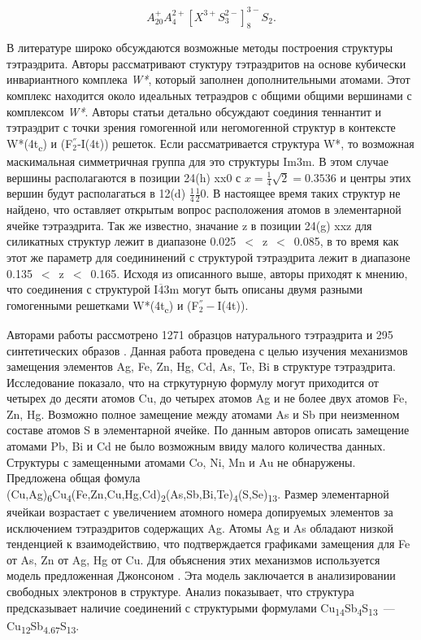 \begin{equation}
  \label{eq:equation3}
  A^+_{20}A^{2+}_4[X^{3+}S^{2-}_{3}]^{3-}_{8}S_2.
\end{equation}



В литературе широко обсуждаются возможные методы построения структуры тэтраэдрита. Авторы \cite{Koch_1981} рассматривают стуктуру тэтраэдритов на основе  кубически инвариантного комплека  \textit{W*}, который заполнен дополнительными атомами. Этот комплекс находится  около идеальных тетраэдров с общими общими вершинами с комплексом \textit{W*}. 
Авторы статьи детально обсуждают соединия теннантит и тэтраэдрит с точки зрения гомогенной или негомогенной структур в контексте W*(4t\textsubscript{c}) и (F$^{''}_{2}$-I(4t)) решеток. 
Если рассматривается структура W*, то возможная маскимальная симметричная группа для это структуры Im3m. В этом случае вершины располагаются в позиции 24(h) xx0 с $x = \frac{1}{4}\sqrt{2} = 0.3536$ и центры этих вершин будут располагаться в 12(d) $\frac{1}{4}\frac{1}{2}0$. 
В настоящее время таких структур не найдено, что оставляет открытым вопрос расположения атомов в элементарной ячейке тэтраэдрита. 
Так же известно, значание  z в позиции 24(g) xxz для силикатных структур лежит в диапазоне 0.025~$<$~z~$<$~0.085, в то время как этот же параметр для соедининений с структурой тэтраэдрита лежит в диапазоне 0.135~$<$~z~$<$~0.165.
Исходя из описанного выше, авторы приходят к мнению, что соединения с структурой I$\overline{\!4}$3m могут быть описаны двумя разными гомогенными решетками W*(4t\textsubscript{c}) и (F$^{''}_{2}-$I(4t)).


Авторами работы \cite{Johnson1986} рассмотрено 1271 образцов натурального тэтраэдрита и 295 синтетических образов . Данная работа проведена с целью изучения механизмов замещения элементов Ag, Fe, Zn, Hg, Cd, As, Te, Bi в структуре тэтраэдрита. Исследование показало, что на стркутурную формулу могут приходится от четырех до десяти атомов Cu,  до четырех атомов Ag и не более двух атомов Fe, Zn, Hg. Возможно полное замещение между атомами As и Sb при неизменном составе атомов S в элементарной ячейке. 
По данным авторов описать замещение атомами Pb, Bi и Cd не было возможным ввиду малого количества данных. Структуры с замещенными атомами Co, Ni, Mn и Au не обнаружены. Предложена общая фомула (Cu,Ag)\textsubscript{6}Cu\textsubscript{4}(Fe,Zn,Cu,Hg,Cd)\textsubscript{2}(As,Sb,Bi,Te)\textsubscript{4}(S,Se)\textsubscript{13}. Размер элементарной ячейкаи возрастает с увеличением атомного номера допируемых элементов за исключением тэтраэдритов содержащих Ag. Атомы Ag и As обладают низкой тенденцией к взаимодействию, что подтверждается графиками замещения для Fe от As, Zn от Ag, Hg от Cu. Для объяснения этих механизмов используется модель предложенная Джонсоном \cite{johnson1983brillouin}. Эта модель заключается в анализировании свободных электронов в структуре. Анализ показывает, что структура предсказывает наличие соединений с структурыми формулами  Cu\textsubscript{14}Sb\textsubscript{4}S\textsubscript{13}~--- Cu\textsubscript{12}Sb\textsubscript{4.67}S\textsubscript{13}.

